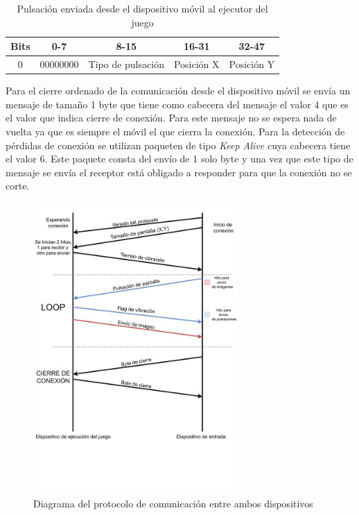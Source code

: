 \begin{table}[h!]
\centering
\begin{tabular}{|l|c|c|c|c|} 
\hline
Bits                    & 0-7               & 8-15                            & 16-31 & 32-47 \\ 
\hline
\multicolumn{1}{|c|}{0} & 00000000 & Tipo de pulsaci\'on & \multicolumn{1}{l|}{Posici\'on X} & \multicolumn{1}{l|}{Posici\'on Y}  \\
\hline
\end{tabular}
\caption{Pulsaci\'on enviada desde el dispositivo m\'ovil al ejecutor del juego}
\label{table:2}
\end{table}

Para el cierre ordenado de la comunicaci\'on desde el dispositivo m\'ovil se env\'ia un mensaje de tama\~no 1 byte que tiene como cabecera del mensaje el valor 4 que es el valor que indica cierre de conexi\'on. Para este mensaje no se espera nada de vuelta ya que es siempre el m\'ovil el que cierra la conexi\'on. Para la detecci\'on de p\'erdidas de conexi\'on se utilizan paqueten de tipo \textit{Keep Alive} cuya cabecera tiene el valor 6. Este paquete consta del env\'io de 1 solo byte y una vez que este tipo de mensaje se env\'ia el receptor est\'a obligado a responder para que la conexi\'on no se corte.

\begin{figure}[h]

\centering
\includegraphics[width=0.7\textwidth]{./Imagenes/Vectorial/Arquitectura}
\caption{Diagrama del protocolo de comunicaci\'on entre ambos dispositivos}
\end{figure}



